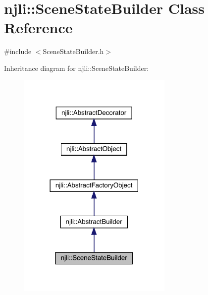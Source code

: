 \hypertarget{classnjli_1_1_scene_state_builder}{}\section{njli\+:\+:Scene\+State\+Builder Class Reference}
\label{classnjli_1_1_scene_state_builder}


{\ttfamily \#include $<$Scene\+State\+Builder.\+h$>$}



Inheritance diagram for njli\+:\+:Scene\+State\+Builder\+:\nopagebreak
\begin{figure}[H]
\begin{center}
\leavevmode
\includegraphics[width=213pt]{classnjli_1_1_scene_state_builder__inherit__graph}
\end{center}
\end{figure}


